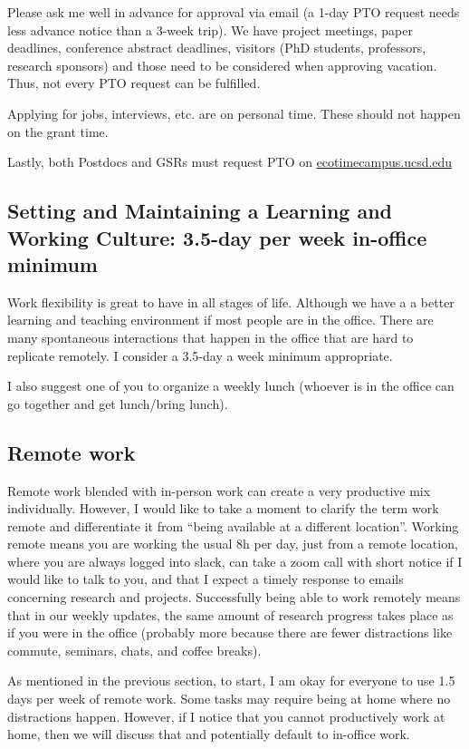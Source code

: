 \documentclass[12pt]{article}
\begin{document}
Please ask me well in advance for approval via email (a 1-day PTO request needs less advance notice than a 3-week trip).
We have project meetings, paper deadlines, conference abstract deadlines, visitors (PhD students, professors, research sponsors) and those need to be considered when approving vacation.
Thus, not every PTO request can be fulfilled.

Applying for jobs, interviews, etc. are on personal time.
These should not happen on the grant time.

Lastly, both Postdocs and GSRs must request PTO on \url{ecotimecampus.ucsd.edu}

\subsection{ Setting and Maintaining a Learning and Working Culture: 3.5-day per week in-office minimum}

Work flexibility is great to have in all stages of life.
Although we have a a better learning and teaching environment if most people are in the office.
There are many spontaneous interactions that happen in the office that are hard to replicate remotely.
I consider a 3.5-day a week minimum appropriate.

I also suggest one of you to organize a weekly lunch (whoever is in the office can go together and get lunch/bring lunch).

\subsection{Remote work}
Remote work blended with in-person work can create a very productive mix individually.
However, I would like to take a moment to clarify the term work remote and differentiate it from ``being available at a different location''.
Working remote means you are working the usual 8h per day, just from a remote location, where you are always logged into slack, can take a zoom call with short notice if I would like to talk to you, and that I expect a timely response to emails concerning research and projects.
Successfully being able to work remotely means that in our weekly updates, the same amount of research progress takes place as if you were in the office (probably more because there are fewer distractions like commute, seminars, chats, and coffee breaks).

As mentioned in the previous section, to start, I am okay for everyone to use 1.5 days per week of remote work.
Some tasks may require being at home where no distractions happen.
However, if I notice that you cannot productively work at home, then we will discuss that and potentially default to in-office work.
\end{document}
